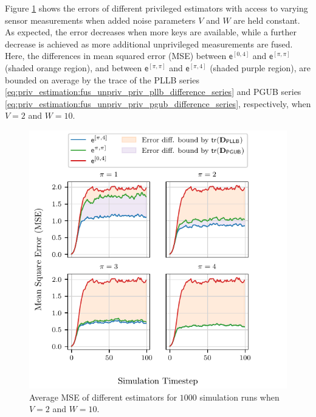 Figure \ref{fig:priv_estimation:fus_mse_privs} shows the errors of different privileged estimators with access to varying sensor measurements when added noise parameters $V$ and $W$ are held constant. As expected, the error decreases when more keys are available, while a further decrease is achieved as more additional unprivileged measurements are fused. Here, the differences in mean squared error (MSE) between $\mathsf{e}^{[0,4]}$ and $\mathsf{e}^{[\pi,\pi]}$ (shaded orange region), and between $\mathsf{e}^{[\pi,\pi]}$ and $\mathsf{e}^{[\pi,4]}$ (shaded purple region), are bounded on average by the trace of the PLLB series \eqref{eq:priv_estimation:fus_unpriv_priv_pllb_difference_series} and PGUB series \eqref{eq:priv_estimation:fus_unpriv_priv_pgub_difference_series}, respectively, when $V=2$ and $W=10$.
\begin{figure}[htbp]
  \centering
  \includegraphics{figures/priv_estimation_fus_mse_privs.pdf}
  \caption{Average MSE of different estimators for $1000$ simulation runs when $V=2$ and $W=10$.}
  \label{fig:priv_estimation:fus_mse_privs}
\end{figure}

